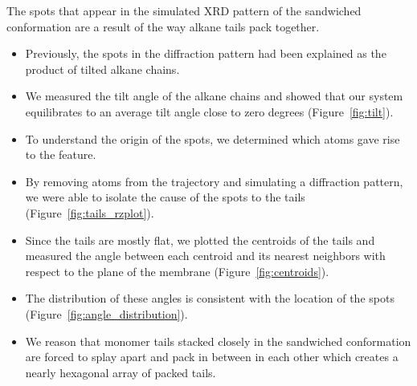 \documentclass{article}
\begin{document}
  The spots that appear in the simulated XRD pattern of the sandwiched
  conformation are a result of the way alkane tails pack together.
  \begin{itemize}
  	\item Previously, the spots in the diffraction pattern had been explained 
	as the product of tilted alkane chains.
	\item We measured the tilt angle of the alkane chains and showed that our 
	system equilibrates to an average tilt angle close to zero degrees (Figure~\ref{fig:tilt}). 
	\item To understand the origin of the spots, we determined which atoms gave rise to the feature.
	\item By removing atoms from the trajectory and simulating a diffraction 
	pattern, we were able to isolate the cause of the spots to the tails (Figure~\ref{fig:tails_rzplot}).
	\item Since the tails are mostly flat, we plotted the centroids of the 
	tails and measured the angle between each centroid and its nearest neighbors
	with respect to the plane of the membrane (Figure~\ref{fig:centroids}).
	\item The distribution of these angles is consistent with the location of 
	the spots (Figure~\ref{fig:angle_distribution}).
	\item We reason that monomer tails stacked closely in the sandwiched conformation
	are forced to splay apart and pack in between in each other which creates a
	nearly hexagonal array of packed tails. 
  \end{itemize}
  
\end{document}

